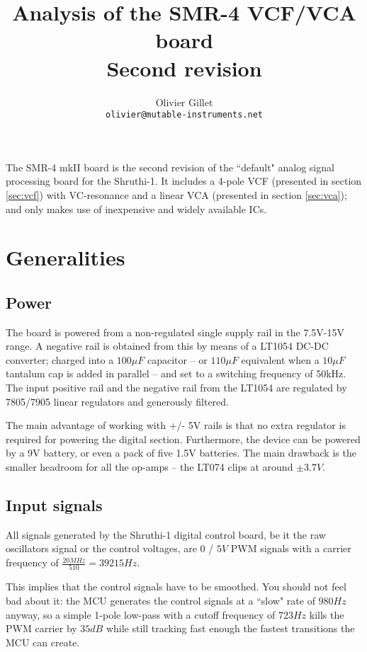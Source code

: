 \documentclass[a4paper,11pt]{article}
\title{Analysis of the SMR-4 VCF/VCA board\\Second revision}
\author{Olivier Gillet \\ \tt olivier@mutable-instruments.net}
\date{}
\begin{document}
\maketitle

The SMR-4 mkII board is the second revision of the ``default" analog signal processing board for the  Shruthi-1. It includes a 4-pole VCF (presented in section \ref{sec:vcf}) with VC-resonance and a linear VCA (presented in section \ref{sec:vca}); and only makes use of inexpensive and widely available ICs.

\section{Generalities}

\subsection{Power}

The board is powered from a non-regulated single supply rail in the 7.5V-15V range. A negative rail is obtained from this by means of a LT1054 DC-DC converter; charged into a $100\mu F$ capacitor -- or $110\mu F$ equivalent when a $10\mu F$ tantalum cap is added in parallel -- and set to a switching frequency of 50kHz. The input positive rail and the negative rail from the LT1054 are regulated by 7805/7905 linear regulators and generously filtered.

The main advantage of working with +/- 5V rails is that no extra regulator is required for powering the digital section. Furthermore, the device can be powered by a 9V battery, or even a pack of five 1.5V batteries. The main drawback is the smaller headroom for all the op-amps -- the LT074 clips at around $\pm 3.7V$.

\subsection{Input signals}

All signals generated by the Shruthi-1 digital control board, be it the raw oscillators signal or the control voltages, are $0$ / $5V$ PWM signals with a carrier frequency of $\frac{20MHz}{510} = 39215 Hz$.

This implies that the control signals have to be smoothed. You should not feel bad about it: the MCU generates the control signals at a ``slow" rate of $980 Hz$ anyway, so a simple 1-pole low-pass with a cutoff frequency of $723 Hz$ kills the PWM carrier by $35dB$ while still tracking fast enough the fastest transitions the MCU can create.
\end{document}

